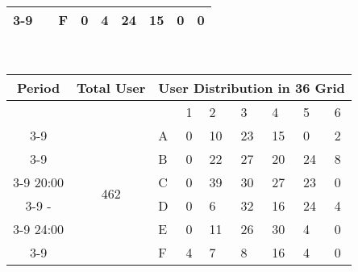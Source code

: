 \begin{table*}[hpt]
\begin{minipage}{.5\linewidth}
\begin{tabular}{|c|c|p{0.4cm}|p{0.4cm}|p{0.4cm}|p{0.4cm}|p{0.4cm}|p{0.4cm}|p{0.4cm}|}
\cline{3-9}	
 && F 	
& 0& 4& 24& 15& 0& 0  \\	
\hline	
\end{tabular}	
\vspace*{0.1in} \\	
\begin{tabular}{|c|c|p{0.4cm}|p{0.4cm}|p{0.4cm}|p{0.4cm}|p{0.4cm}|p{0.4cm}|p{0.4cm}|}	
\hline	
Period & Total User &\multicolumn{7}{c|}{User Distribution in 36 Grid} \\	
\hline	
&& & 1 &2 & 3 & 4 & 5&6\\	
\cline{3-9}	
 & \multirow{7}{*}{462}	
 &A	
& 0& 10& 23& 15& 0& 2  \\	
\cline{3-9}	
 && B	
& 0& 22& 27& 20& 24& 8  \\	
\cline{3-9}	
20:00 && C	
& 0& 39& 30& 27& 23& 0  \\	
\cline{3-9}	
 -&& D 	
& 0& 6& 32& 16& 24& 4  \\	
\cline{3-9}	
24:00 && E 	
& 0& 11& 26& 30& 4& 0  \\	
\cline{3-9}	
 && F 	
& 4& 7& 8& 16& 4& 0  \\	
\hline	
\end{tabular}	
\vspace*{0.1in} \\	
\end{minipage}	
\label{table:dallas_cluster}	
\caption{User Distribution in Districts of Dallas}	
\end{table*}	
